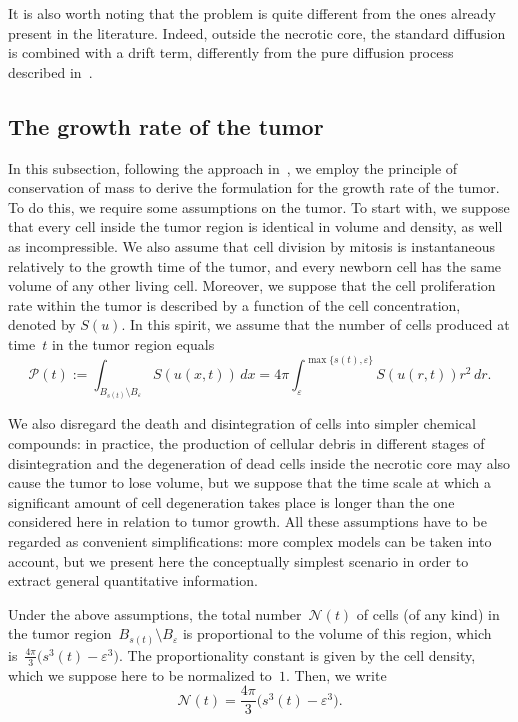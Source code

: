 \documentclass[12pt,a4paper,intlimits,sumlimits]{amsart}
\theoremstyle{definition}
\theoremstyle{plain}
\numberwithin{equation}{section}
\begin{document}
It is also
worth noting that the problem is quite different from the ones already present in the literature. Indeed, 
outside the necrotic core, the standard diffusion is combined with a drift term, differently from the pure diffusion process described in~\cite{MR1684873}.

\subsection{The growth rate of the tumor}

In this subsection, following the approach in~\cite{greenspan}, we employ the principle of conservation of mass to derive the formulation for the growth rate of the tumor. To do this, we require some assumptions on the tumor. To start with, we suppose that every cell inside the tumor region is identical
in volume and density, as well as incompressible. We also assume that cell division by mitosis is instantaneous relatively to the growth time of the tumor, and every newborn cell has the same volume of any other living cell. Moreover, we suppose that the cell proliferation rate within the tumor is described by a function of the cell concentration, denoted by $S(u)$.
In this spirit, we assume that the number of cells produced at time~$t$ in the tumor region equals
\begin{equation}\label{NEWBORN}
{\mathcal{P}}(t):=\int_{B_{s(t)}\setminus B_\varepsilon} S(u(x,t))\,dx=
4\pi\int^{\max\{s(t),\varepsilon\}}_\varepsilon S(u(r,t))r^2\,dr.
\end{equation}

We also disregard the death and disintegration of cells into simpler chemical compounds:
in practice,
the production of
cellular debris in different stages of disintegration
and the degeneration of dead cells inside the necrotic core may also cause the tumor to lose volume,
but we suppose that the time scale at which a significant amount of
cell degeneration takes place
is longer than the one considered here in relation to tumor growth.
All these assumptions have to be regarded as convenient simplifications:
more complex models can be taken into account, but we present here
the conceptually simplest scenario in order to extract general quantitative information.

Under the above assumptions, the total number~${\mathcal{N}}(t)$ of cells
(of any kind) in the tumor region~$B_{s(t)}\setminus B_\varepsilon$
is proportional to the volume of this region, which is~$\frac{4\pi}3\big(s^3(t)-\varepsilon^3\big)$. The proportionality constant
is given by the cell density, which we suppose here to be normalized to~$1$. Then, we write
\begin{equation}\label{NUMEROC}
{\mathcal{N}}(t)=\frac{4\pi}3\big(s^3(t)-\varepsilon^3\big).\end{equation}
\end{document}
